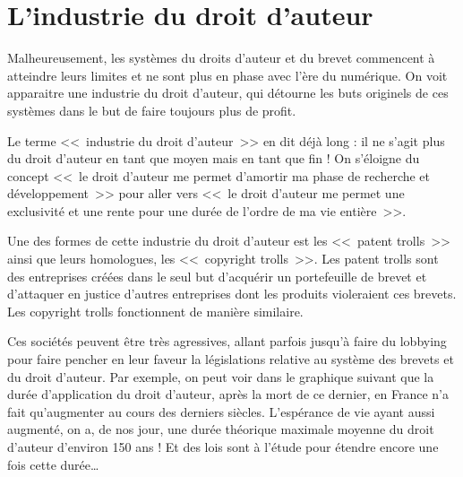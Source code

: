 \section{L'industrie du droit d'auteur}

Malheureusement, les systèmes du droits d'auteur et du brevet commencent à atteindre leurs limites et ne sont plus en phase avec l'ère du numérique.
On voit apparaitre une industrie du droit d'auteur, qui détourne les buts originels de ces systèmes dans le but de faire toujours plus de profit.

Le terme <<~industrie du droit d'auteur~>> en dit déjà long : il ne s'agit plus du droit d'auteur en tant que moyen mais en tant que fin !
On s'éloigne du concept <<~le droit d'auteur me permet d'amortir ma phase de recherche et développement~>> pour aller vers <<~le droit d'auteur me permet une exclusivité et une rente pour une durée de l'ordre de ma vie entière~>>.

Une des formes de cette industrie du droit d'auteur est les <<~patent trolls~>> ainsi que leurs homologues, les <<~copyright trolls~>>.
Les patent trolls sont des entreprises créées dans le seul but d'acquérir un portefeuille de brevet et d'attaquer en justice d'autres entreprises dont les produits violeraient ces brevets.
Les copyright trolls fonctionnent de manière similaire.

Ces sociétés peuvent être très agressives, allant parfois jusqu'à faire du lobbying pour faire pencher en leur faveur la législations relative au système des brevets et du droit d'auteur.
Par exemple, on peut voir dans le graphique suivant que la durée d'application du droit d'auteur, après la mort de ce dernier, en France n'a fait qu'augmenter au cours des derniers siècles.
L'espérance de vie ayant aussi augmenté, on a, de nos jour, une durée théorique maximale moyenne du droit d'auteur d'environ 150 ans ! Et des lois sont à l'étude pour étendre encore une fois cette durée\dots{}

